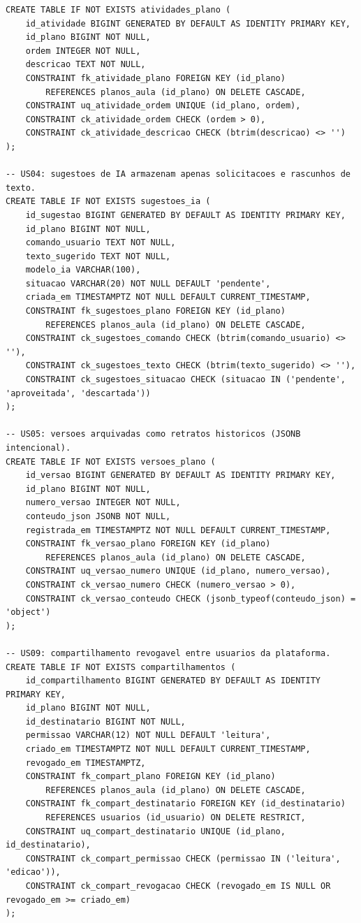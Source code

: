 \documentclass[12pt,a4paper,oneside]{report}
\begin{document}
\begin{lstlisting}[style=aulasql,caption={Código SQL completo do banco de dados Aula em Dia},label={lst:bd-ddl}]
CREATE TABLE IF NOT EXISTS atividades_plano (
    id_atividade BIGINT GENERATED BY DEFAULT AS IDENTITY PRIMARY KEY,
    id_plano BIGINT NOT NULL,
    ordem INTEGER NOT NULL,
    descricao TEXT NOT NULL,
    CONSTRAINT fk_atividade_plano FOREIGN KEY (id_plano)
        REFERENCES planos_aula (id_plano) ON DELETE CASCADE,
    CONSTRAINT uq_atividade_ordem UNIQUE (id_plano, ordem),
    CONSTRAINT ck_atividade_ordem CHECK (ordem > 0),
    CONSTRAINT ck_atividade_descricao CHECK (btrim(descricao) <> '')
);

-- US04: sugestoes de IA armazenam apenas solicitacoes e rascunhos de texto.
CREATE TABLE IF NOT EXISTS sugestoes_ia (
    id_sugestao BIGINT GENERATED BY DEFAULT AS IDENTITY PRIMARY KEY,
    id_plano BIGINT NOT NULL,
    comando_usuario TEXT NOT NULL,
    texto_sugerido TEXT NOT NULL,
    modelo_ia VARCHAR(100),
    situacao VARCHAR(20) NOT NULL DEFAULT 'pendente',
    criada_em TIMESTAMPTZ NOT NULL DEFAULT CURRENT_TIMESTAMP,
    CONSTRAINT fk_sugestoes_plano FOREIGN KEY (id_plano)
        REFERENCES planos_aula (id_plano) ON DELETE CASCADE,
    CONSTRAINT ck_sugestoes_comando CHECK (btrim(comando_usuario) <> ''),
    CONSTRAINT ck_sugestoes_texto CHECK (btrim(texto_sugerido) <> ''),
    CONSTRAINT ck_sugestoes_situacao CHECK (situacao IN ('pendente', 'aproveitada', 'descartada'))
);

-- US05: versoes arquivadas como retratos historicos (JSONB intencional).
CREATE TABLE IF NOT EXISTS versoes_plano (
    id_versao BIGINT GENERATED BY DEFAULT AS IDENTITY PRIMARY KEY,
    id_plano BIGINT NOT NULL,
    numero_versao INTEGER NOT NULL,
    conteudo_json JSONB NOT NULL,
    registrada_em TIMESTAMPTZ NOT NULL DEFAULT CURRENT_TIMESTAMP,
    CONSTRAINT fk_versao_plano FOREIGN KEY (id_plano)
        REFERENCES planos_aula (id_plano) ON DELETE CASCADE,
    CONSTRAINT uq_versao_numero UNIQUE (id_plano, numero_versao),
    CONSTRAINT ck_versao_numero CHECK (numero_versao > 0),
    CONSTRAINT ck_versao_conteudo CHECK (jsonb_typeof(conteudo_json) = 'object')
);

-- US09: compartilhamento revogavel entre usuarios da plataforma.
CREATE TABLE IF NOT EXISTS compartilhamentos (
    id_compartilhamento BIGINT GENERATED BY DEFAULT AS IDENTITY PRIMARY KEY,
    id_plano BIGINT NOT NULL,
    id_destinatario BIGINT NOT NULL,
    permissao VARCHAR(12) NOT NULL DEFAULT 'leitura',
    criado_em TIMESTAMPTZ NOT NULL DEFAULT CURRENT_TIMESTAMP,
    revogado_em TIMESTAMPTZ,
    CONSTRAINT fk_compart_plano FOREIGN KEY (id_plano)
        REFERENCES planos_aula (id_plano) ON DELETE CASCADE,
    CONSTRAINT fk_compart_destinatario FOREIGN KEY (id_destinatario)
        REFERENCES usuarios (id_usuario) ON DELETE RESTRICT,
    CONSTRAINT uq_compart_destinatario UNIQUE (id_plano, id_destinatario),
    CONSTRAINT ck_compart_permissao CHECK (permissao IN ('leitura', 'edicao')),
    CONSTRAINT ck_compart_revogacao CHECK (revogado_em IS NULL OR revogado_em >= criado_em)
);


\end{lstlisting}
\end{document}
